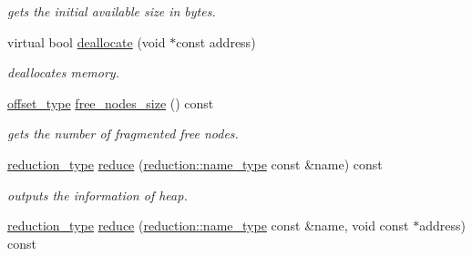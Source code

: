 \begin{DoxyCompactItemize}
\begin{DoxyCompactList}\small\item\em gets the initial available size in bytes. \end{DoxyCompactList}\item 
virtual bool \hyperlink{classhryky_1_1memory_1_1heap_1_1_arbitrary_ab8da13524b1b371f3bf40d61101dee9e}{deallocate} (void $\ast$const address)
\begin{DoxyCompactList}\small\item\em deallocates memory. \end{DoxyCompactList}\item 
\hypertarget{classhryky_1_1memory_1_1heap_1_1_arbitrary_a6ceca7a49c84cd56b06e3c86b82f5520}{\hyperlink{classhryky_1_1memory_1_1heap_1_1_arbitrary_a93027662f345b66e738ce8b2c9293e94}{offset\-\_\-type} \hyperlink{classhryky_1_1memory_1_1heap_1_1_arbitrary_a6ceca7a49c84cd56b06e3c86b82f5520}{free\-\_\-nodes\-\_\-size} () const }\label{classhryky_1_1memory_1_1heap_1_1_arbitrary_a6ceca7a49c84cd56b06e3c86b82f5520}

\begin{DoxyCompactList}\small\item\em gets the number of fragmented free nodes. \end{DoxyCompactList}\item 
\hypertarget{classhryky_1_1memory_1_1heap_1_1_arbitrary_aa2a502d1d07f6e4f38d1a98a6411c01d}{\hyperlink{namespacehryky_a343a9a4c36a586be5c2693156200eadc}{reduction\-\_\-type} \hyperlink{classhryky_1_1memory_1_1heap_1_1_arbitrary_aa2a502d1d07f6e4f38d1a98a6411c01d}{reduce} (\hyperlink{namespacehryky_1_1reduction_ac686c30a4c8d196bbd0f05629a6b921f}{reduction\-::name\-\_\-type} const \&name) const }\label{classhryky_1_1memory_1_1heap_1_1_arbitrary_aa2a502d1d07f6e4f38d1a98a6411c01d}

\begin{DoxyCompactList}\small\item\em outputs the information of heap. \end{DoxyCompactList}\item 
\hypertarget{classhryky_1_1memory_1_1heap_1_1_arbitrary_aee51396ef67a8913436071e1daab52f9}{\hyperlink{namespacehryky_a343a9a4c36a586be5c2693156200eadc}{reduction\-\_\-type} \hyperlink{classhryky_1_1memory_1_1heap_1_1_arbitrary_aee51396ef67a8913436071e1daab52f9}{reduce} (\hyperlink{namespacehryky_1_1reduction_ac686c30a4c8d196bbd0f05629a6b921f}{reduction\-::name\-\_\-type} const \&name, void const $\ast$address) const }\label{classhryky_1_1memory_1_1heap_1_1_arbitrary_aee51396ef67a8913436071e1daab52f9}


\end{DoxyCompactItemize}
